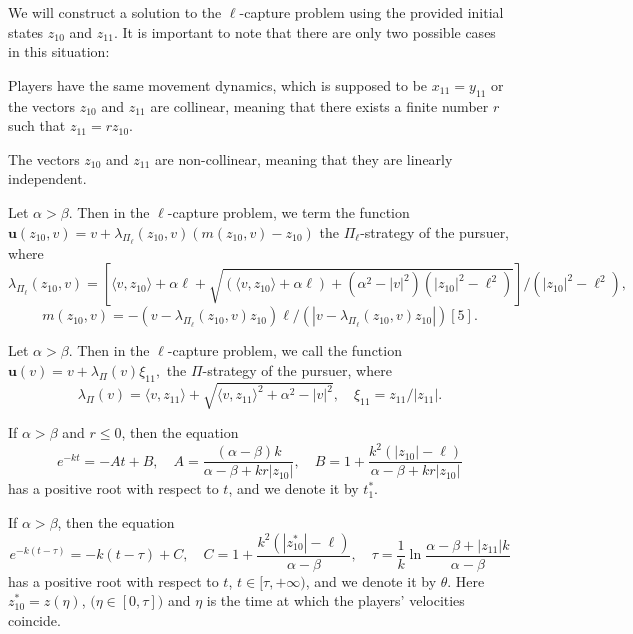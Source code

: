 \documentclass[12pt]{llncs}
\begin{document}
We will construct a solution to the $\ell$-capture problem using the provided initial states $z_{10}$ and $z_{11}$. It is important to note that there are only two possible cases in this situation:
\begin{case}
Players have the same movement dynamics, which is supposed to be $x_{11}=y_{11}$ or the vectors $z_{10}$ and $z_{11}$ are collinear, meaning that there exists a finite number $r$ such that $z_{11}=r z_{10}$.
\end{case}
\begin{case}
The vectors $z_{10}$ and $z_{11}$ are non-collinear, meaning that they are linearly independent.
\end{case}
\begin{definition}
Let $\alpha>\beta$. Then  in the $\ell$-capture problem, we term the function \\
$
\textbf{u}(z_{10}, v)=v+\lambda_{\Pi_\ell}(z_{10},v)\left(m(z_{10},v)-z_{10}\right)
$
 the $\Pi_\ell$-strategy of the pursuer, where
\begin{equation*}
\lambda_{\Pi_\ell}(z_{10}, v)=\left[\langle v, z _{10}\rangle+\alpha \ell+\sqrt{(\langle v, z _{10}\rangle+\alpha \ell)+(\alpha^{2}-|v|^{2})(|z_{10}|^2-\ell^2)}\right]/(|z_{10}|^2-\ell^2),
 \end{equation*}
 $$
 m(z_{10},v)=-(v-\lambda_{\Pi_\ell}(z_{10},v) z_{10})\ell/(|v-\lambda_{\Pi_\ell}(z_{10},v) z_{10}|) [5].
 $$
\end{definition}
\begin{definition}
Let $\alpha>\beta$. Then  in the $\ell$-capture problem, we call the function \\
$
\textbf{u}(v)=v+\lambda_{\Pi}(v)\xi_{11},
$
the $\Pi$-strategy of the pursuer, where
\begin{equation*}
\lambda_{\Pi}(v)=\langle v, z _{11}\rangle+\sqrt{\langle v, z _{11}\rangle^2+\alpha^{2}-|v|^{2}},\quad \xi_{11}=z _{11}/|z _{11}|.
 \end{equation*}
\end{definition}
\begin{proposition}
If $\alpha>\beta$ and $r\leq0$, then the equation
\begin{equation*}
e^{-kt}=-At+B,\quad A=\frac{(\alpha-\beta)k}{\alpha-\beta+kr|z_{10}|},\quad B=1+\frac{k^2(|z_{10}|-\ell)}{\alpha-\beta+kr|z_{10}|}
\end{equation*}
has a positive root with respect to $t$, and we denote it by $t^{*}_{1}$.
\end{proposition}

\begin{proposition}
If $\alpha>\beta$, then the equation
\begin{equation*}
e^{-k(t-\tau)}=-k(t-\tau)+C,\quad C=1+\frac{k^2(|z^{*}_{10}|-\ell)}{\alpha-\beta},\quad \tau=\frac{1}{k}\ln{\frac{\alpha-\beta+|z_{11}|k}{\alpha-\beta}}
\end{equation*}
has a positive root with respect to $t$, $t\in[\tau,+\infty)$, and we denote it by $\theta$. Here $z^{*}_{10}=z(\eta)$, $\big(\eta\in[0,\tau]\big)$ and $\eta$ is the time at which the players' velocities coincide.
\end{proposition}
\end{document}
